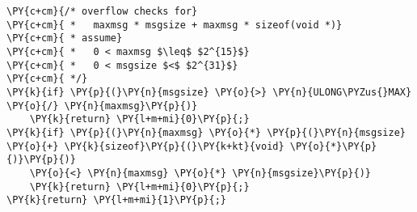 \begin{Verbatim}[commandchars=\\\{\},codes={\catcode`\$=3\catcode`\^=7\catcode`\_=8}]
\PY{c+cm}{/* overflow checks for}
\PY{c+cm}{ *   maxmsg * msgsize + maxmsg * sizeof(void *)}
\PY{c+cm}{ * assume}
\PY{c+cm}{ *   0 < maxmsg $\leq$ $2^{15}$}
\PY{c+cm}{ *   0 < msgsize $<$ $2^{31}$}
\PY{c+cm}{ */}
\PY{k}{if} \PY{p}{(}\PY{n}{msgsize} \PY{o}{>} \PY{n}{ULONG\PYZus{}MAX} \PY{o}{/} \PY{n}{maxmsg}\PY{p}{)}
    \PY{k}{return} \PY{l+m+mi}{0}\PY{p}{;}
\PY{k}{if} \PY{p}{(}\PY{n}{maxmsg} \PY{o}{*} \PY{p}{(}\PY{n}{msgsize} \PY{o}{+} \PY{k}{sizeof}\PY{p}{(}\PY{k+kt}{void} \PY{o}{*}\PY{p}{)}\PY{p}{)}
    \PY{o}{<} \PY{n}{maxmsg} \PY{o}{*} \PY{n}{msgsize}\PY{p}{)}
    \PY{k}{return} \PY{l+m+mi}{0}\PY{p}{;}
\PY{k}{return} \PY{l+m+mi}{1}\PY{p}{;}
\end{Verbatim}
